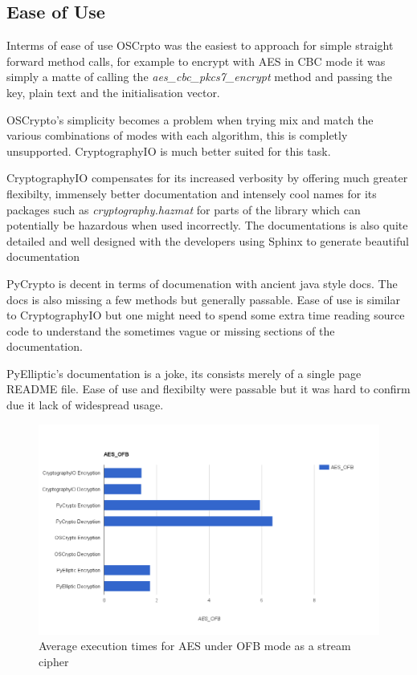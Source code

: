 \documentclass[10pt,conference]{IEEEtran}
\begin{document}
\subsection{Ease of Use}

Interms of ease of use OSCrpto was the easiest to approach for simple straight forward method calls, for example to encrypt with AES in CBC mode it was simply a matte of calling the \textit{aes\_cbc\_pkcs7\_encrypt} method and passing the key, plain text and the initialisation vector.

OSCrypto's simplicity becomes a problem when trying mix and match the various combinations of modes with each algorithm, this is completly unsupported. CryptographyIO is much better suited for this task.

CryptographyIO compensates for its increased verbosity by offering much greater flexibilty, immensely better documentation and intensely cool names for its packages such as \textit{cryptography.hazmat} for parts of the library which can potentially be hazardous when used incorrectly. The documentations is also quite detailed and well designed with the developers using Sphinx to generate beautiful documentation

PyCrypto is decent in terms of documenation with ancient java style docs. The docs is also missing a few methods but generally passable. Ease of use is similar to CryptographyIO but one might need to spend some extra time reading source code to understand the sometimes vague or missing sections of the documentation.

PyElliptic's documentation is a joke, its consists merely of a single page README file. Ease of use and flexibilty were passable but it was hard to confirm due it lack of widespread usage. 


\begin{figure}
\centering
\includegraphics[width=0.7\linewidth]{./aesofb}
\caption{Average execution times for AES under OFB mode as a stream cipher}
\label{fig:aesofb}
\end{figure}
\end{document}

